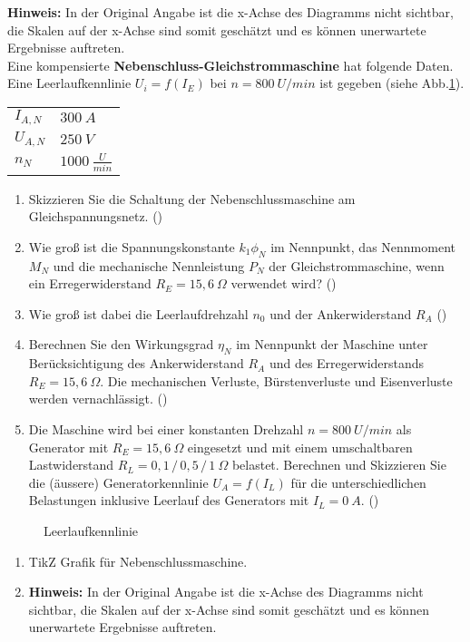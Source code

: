 \begin{question}[topic=gsm,name={14.10.2015},type=exam,tags={20151014}]
\textbf{Hinweis:} In der Original Angabe ist die x-Achse des Diagramms nicht sichtbar, die Skalen auf der x-Achse sind somit geschätzt und es können unerwartete Ergebnisse auftreten.\\
Eine kompensierte \textbf{Nebenschluss-Gleichstrommaschine} hat folgende Daten. Eine Leerlaufkennlinie $U_i=f(I_E)$ bei $n=800~U/min$ ist gegeben (siehe Abb.\ref{fig:20151014}).\\
\begin{tabular}{L{2cm}l}
$I_{A,N}$ \dotfill &$300~A$\\
$U_{A,N}$ \dotfill & $250~V$ \\
$n_N$ \dotfill & $1000~\frac{U}{min}$
\end{tabular}
\begin{enumerate}
\item Skizzieren Sie die Schaltung der Nebenschlussmaschine am Gleichspannungsnetz. ()
\item Wie groß ist die Spannungskonstante $k_1 \phi_N$ im Nennpunkt, das Nennmoment $M_N$ und die mechanische Nennleistung $P_N$ der Gleichstrommaschine, wenn ein Erregerwiderstand $R_E=15,6~\Omega$ verwendet wird? ()
\item Wie groß ist dabei die Leerlaufdrehzahl $n_0$ und der Ankerwiderstand $R_A$ ()
\item Berechnen Sie den Wirkungsgrad $\eta_N$ im Nennpunkt der Maschine unter Berücksichtigung des Ankerwiderstand $R_A$ und des Erregerwiderstands $R_E = 15,6~\Omega$. Die mechanischen Verluste, Bürstenverluste und Eisenverluste werden vernachlässigt. ()
\item Die Maschine wird bei einer konstanten Drehzahl $n=800~U/min$ als Generator mit $R_E =15,6~\Omega$ eingesetzt und mit einem umschaltbaren Lastwiderstand $R_L = 0,1\, /\, 0,5\, /\, 1 ~\Omega$ belastet. Berechnen und Skizzieren Sie die (äussere) Generatorkennlinie $U_A=f(I_L)$ für die unterschiedlichen Belastungen inklusive Leerlauf des Generators mit $I_L = 0~A$. ()
\end{enumerate}
\begin{figure}[H]
\caption{Leerlaufkennlinie} \label{fig:20151014}
\end{figure}
\end{question}
\begin{solution}
\begin{enumerate}
\item TikZ Grafik für Nebenschlussmaschine.
\item \textbf{Hinweis:} In der Original Angabe ist die x-Achse des Diagramms nicht sichtbar, die Skalen auf der x-Achse sind somit geschätzt und es können unerwartete Ergebnisse auftreten.
\end{enumerate}
\end{solution}